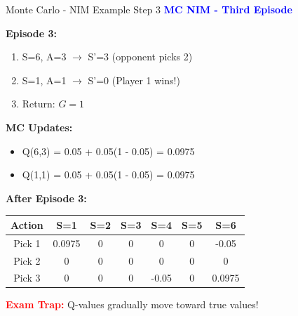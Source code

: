 \documentclass[8pt]{beamer}
\begin{document}
\begin{frame}{Monte Carlo - NIM Example Step 3}
\fontsize{6.5}{7.5}\selectfont
\textcolor{blue}{\textbf{MC NIM - Third Episode}}

\textbf{Episode 3:}
\begin{enumerate}
\item S=6, A=3 $\rightarrow$ S'=3 (opponent picks 2)
\item S=1, A=1 $\rightarrow$ S'=0 (Player 1 wins!)
\item Return: $G = 1$
\end{enumerate}

\textbf{MC Updates:}
\begin{itemize}
\item Q(6,3) = 0.05 + 0.05(1 - 0.05) = 0.0975
\item Q(1,1) = 0.05 + 0.05(1 - 0.05) = 0.0975
\end{itemize}

\textbf{After Episode 3:}
\begin{tabular}{|c|c|c|c|c|c|c|}
\hline
Action & S=1 & S=2 & S=3 & S=4 & S=5 & S=6 \\
\hline
Pick 1 & 0.0975 & 0 & 0 & 0 & 0 & -0.05 \\
\hline
Pick 2 & 0 & 0 & 0 & 0 & 0 & 0 \\
\hline
Pick 3 & 0 & 0 & 0 & -0.05 & 0 & 0.0975 \\
\hline
\end{tabular}

\textcolor{red}{\textbf{Exam Trap:}} Q-values gradually move toward true values!
\end{frame}
\end{document}
